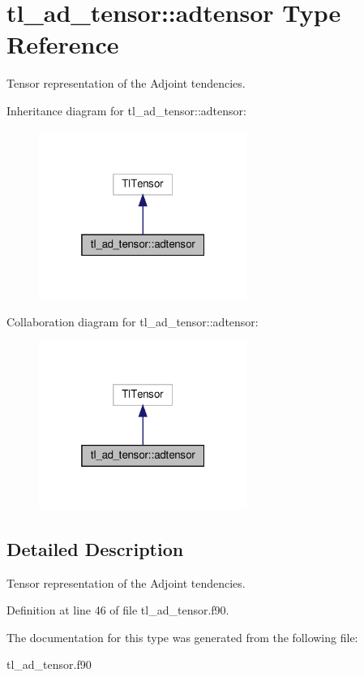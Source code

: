 \hypertarget{structtl__ad__tensor_1_1adtensor}{}\section{tl\+\_\+ad\+\_\+tensor\+:\+:adtensor Type Reference}
\label{structtl__ad__tensor_1_1adtensor}


Tensor representation of the Adjoint tendencies.  




Inheritance diagram for tl\+\_\+ad\+\_\+tensor\+:\+:adtensor\+:\nopagebreak
\begin{figure}[H]
\begin{center}
\leavevmode
\includegraphics[width=193pt]{structtl__ad__tensor_1_1adtensor__inherit__graph}
\end{center}
\end{figure}


Collaboration diagram for tl\+\_\+ad\+\_\+tensor\+:\+:adtensor\+:\nopagebreak
\begin{figure}[H]
\begin{center}
\leavevmode
\includegraphics[width=193pt]{structtl__ad__tensor_1_1adtensor__coll__graph}
\end{center}
\end{figure}


\subsection{Detailed Description}
Tensor representation of the Adjoint tendencies. 

Definition at line 46 of file tl\+\_\+ad\+\_\+tensor.\+f90.



The documentation for this type was generated from the following file\+:\begin{DoxyCompactItemize}
\item 
tl\+\_\+ad\+\_\+tensor.\+f90\end{DoxyCompactItemize}
